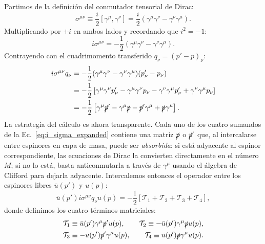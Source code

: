 \documentclass[10pt,a4paper]{article}
\begin{document}
Partimos de la definición del conmutador tensorial de Dirac:
\begin{equation}
\sigma^{\mu\nu} \equiv \frac{i}{2} [\gamma^\mu, \gamma^\nu] = \frac{i}{2} (\gamma^\mu \gamma^\nu - \gamma^\nu \gamma^\mu).
\end{equation}
Multiplicando por $+i$ en ambos lados y recordando que $i^2 = -1$:
\begin{equation}
i \sigma^{\mu\nu} = -\frac{1}{2} (\gamma^\mu \gamma^\nu - \gamma^\nu \gamma^\mu).
\end{equation}
Contrayendo con el cuadrimomento transferido $q_\nu = (p' - p)_\nu$:
\begin{align}
i \sigma^{\mu\nu} q_\nu &= -\frac{1}{2} (\gamma^\mu \gamma^\nu - \gamma^\nu \gamma^\mu)(p'_\nu - p_\nu) \nonumber \\
&= -\frac{1}{2} \left[ \gamma^\mu \gamma^\nu p'_\nu - \gamma^\mu \gamma^\nu p_\nu - \gamma^\nu \gamma^\mu p'_\nu + \gamma^\nu \gamma^\mu p_\nu \right] \nonumber \\
&= -\frac{1}{2} \left[ \gamma^\mu \slashed{p}' - \gamma^\mu \slashed{p} - \slashed{p}' \gamma^\mu + \slashed{p} \gamma^\mu \right].
\label{eq:i_sigma_expanded}
\end{align}
La estrategia del cálculo es ahora transparente. Cada uno de los cuatro sumandos de la Ec.~\eqref{eq:i_sigma_expanded} contiene una matriz $\slashed{p}$ o $\slashed{p}'$ que, al intercalarse entre espinores en capa de masa, puede ser \emph{absorbida}: si está adyacente al espinor correspondiente, las ecuaciones de Dirac la convierten directamente en el número $M$; si no lo está, basta anticonmutarla a través de $\gamma^\mu$ usando el álgebra de Clifford para dejarla adyacente. Intercalemos entonces el operador entre los espinores libres $\bar{u}(p')$ y $u(p)$:
\begin{equation}
\bar{u}(p') i\sigma^{\mu\nu} q_\nu u(p) = -\frac{1}{2} \left[ \mathcal{T}_1 + \mathcal{T}_2 + \mathcal{T}_3 + \mathcal{T}_4 \right],
\end{equation}
donde definimos los cuatro términos matriciales:
\begin{align}
\mathcal{T}_1 &\equiv \bar{u}(p') \gamma^\mu \slashed{p}' u(p), \qquad \mathcal{T}_2 \equiv -\bar{u}(p') \gamma^\mu \slashed{p} u(p), \\
\mathcal{T}_3 &\equiv -\bar{u}(p') \slashed{p}' \gamma^\mu u(p), \qquad \mathcal{T}_4 \equiv \bar{u}(p') \slashed{p} \gamma^\mu u(p).
\end{align}
\end{document}
